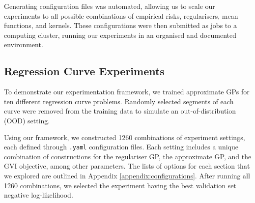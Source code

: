 \documentclass{article}
\def\code#1{\texttt{#1}}
\numberwithin{equation}{section}
\begin{document}
Generating configuration files was automated, allowing us to scale our experiments to all possible combinations of empirical risks, regularisers, mean functions, and kernels. 
These configurations were then submitted as jobs to a computing cluster, running our experiments in an organised and documented environment.

\subsection{Regression Curve Experiments}
To demonstrate our experimentation framework, we trained approximate GPs for ten different regression curve problems. 
Randomly selected segments of each curve were removed from the training data to simulate an out-of-distribution (OOD) setting.

Using our framework, we constructed 1260 combinations of experiment settings, each defined through \code{.yaml} configuration files. 
Each setting includes a unique combination of constructions for the regulariser GP, the approximate GP, and the GVI objective, among other parameters. 
The lists of options for each section that we explored are outlined in Appendix \ref{appendix:configurations}.
After running all 1260 combinations, we selected the experiment having the best validation set negative log-likelihood. 
\end{document}
